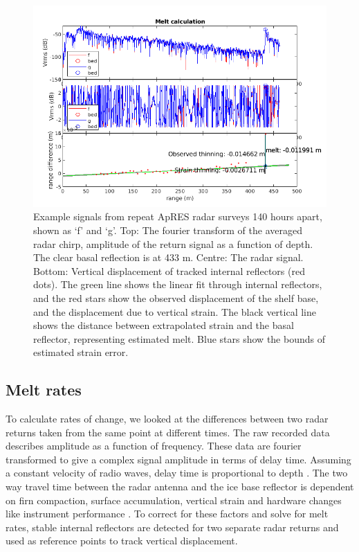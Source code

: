 \begin{figure}[!ht]
\centering
\includegraphics[width=1\textwidth]{chapters/3/melt_calc.png}
\caption[ApRES example]{Example signals from repeat ApRES radar surveys 140 hours apart, shown as `f' and `g'. Top: The fourier transform of the averaged radar chirp, amplitude of the return signal as a function of depth. The clear basal reflection is at 433 m. Centre: The radar signal.
Bottom: Vertical displacement of tracked internal reflectors (red dots). The green line shows the linear fit through internal reflectors, and the red stars show the observed displacement of the shelf base, and the displacement due to vertical strain. The black vertical line shows the distance between extrapolated strain and the basal reflector, representing estimated melt. Blue stars show the bounds of estimated strain error. }
\label{fig:example_signal}
\end{figure}

\subsection{Melt rates}

To calculate rates of change, we looked at the differences between two radar returns taken from the same point at different times.
The raw recorded data describes amplitude as a function of frequency. These data are fourier transformed to give a complex signal amplitude in terms of delay time. Assuming a constant velocity of radio waves, delay time is proportional to depth \citep{nicholls2015ground}. 
The two way travel time between the radar antenna and the ice base reflector is dependent on firn compaction, surface accumulation, vertical strain and hardware changes like instrument performance \citep{nicholls2015ground}. To correct for these factors and solve for melt rates, stable internal reflectors are detected for two separate radar returns and used as reference points to track vertical displacement. 

